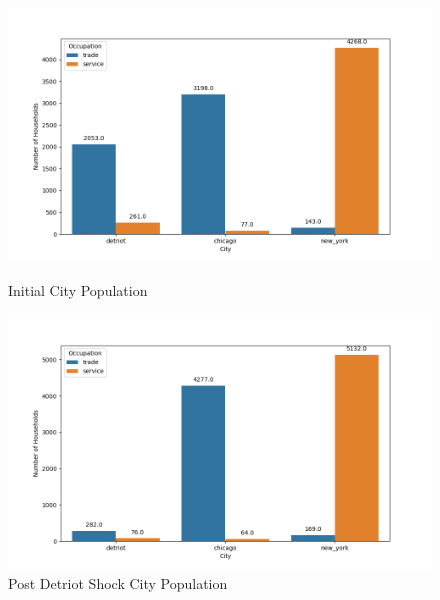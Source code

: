 \documentclass[10pt]{article}
\begin{document}
\begin{figure}[!htb]
    \begin{minipage}{0.5\textwidth}
        \centering
        \includegraphics[width=\textwidth]{../../simulations/graphs/city_pop.png}
        \caption{Initial City Population}
        \label{city_pop}
    \end{minipage}
    \begin{minipage}{0.5\textwidth}
        \centering
        \includegraphics[width=\textwidth]{../../simulations/graphs/c_shock.png}
        \caption{Post Detriot Shock City Population}
        \label{c_shock}
    \end{minipage}
\end{figure}
\end{document}
